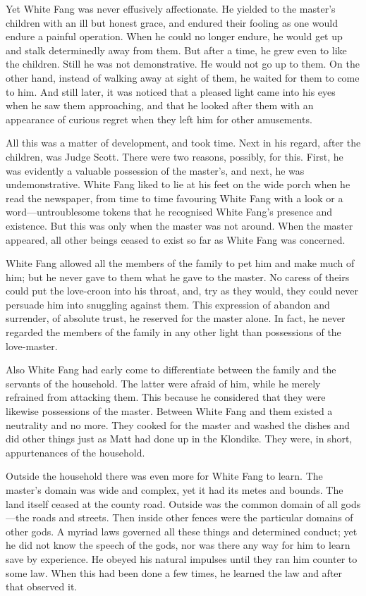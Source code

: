 \documentclass[10pt]{book}
\begin{document}
Yet White Fang was never effusively affectionate. He yielded to the
master’s children with an ill but honest grace, and endured their
fooling as one would endure a painful operation. When he could no
longer endure, he would get up and stalk determinedly away from them.
But after a time, he grew even to like the children. Still he was not
demonstrative. He would not go up to them. On the other hand, instead
of walking away at sight of them, he waited for them to come to him.
And still later, it was noticed that a pleased light came into his eyes
when he saw them approaching, and that he looked after them with an
appearance of curious regret when they left him for other amusements.

All this was a matter of development, and took time. Next in his
regard, after the children, was Judge Scott. There were two reasons,
possibly, for this. First, he was evidently a valuable possession of
the master’s, and next, he was undemonstrative. White Fang liked to lie
at his feet on the wide porch when he read the newspaper, from time to
time favouring White Fang with a look or a word—untroublesome tokens
that he recognised White Fang’s presence and existence. But this was
only when the master was not around. When the master appeared, all
other beings ceased to exist so far as White Fang was concerned.

White Fang allowed all the members of the family to pet him and make
much of him; but he never gave to them what he gave to the master. No
caress of theirs could put the love-croon into his throat, and, try as
they would, they could never persuade him into snuggling against them.
This expression of abandon and surrender, of absolute trust, he
reserved for the master alone. In fact, he never regarded the members
of the family in any other light than possessions of the love-master.

Also White Fang had early come to differentiate between the family and
the servants of the household. The latter were afraid of him, while he
merely refrained from attacking them. This because he considered that
they were likewise possessions of the master. Between White Fang and
them existed a neutrality and no more. They cooked for the master and
washed the dishes and did other things just as Matt had done up in the
Klondike. They were, in short, appurtenances of the household.

Outside the household there was even more for White Fang to learn. The
master’s domain was wide and complex, yet it had its metes and bounds.
The land itself ceased at the county road. Outside was the common
domain of all gods—the roads and streets. Then inside other fences were
the particular domains of other gods. A myriad laws governed all these
things and determined conduct; yet he did not know the speech of the
gods, nor was there any way for him to learn save by experience. He
obeyed his natural impulses until they ran him counter to some law.
When this had been done a few times, he learned the law and after that
observed it.
\end{document}
